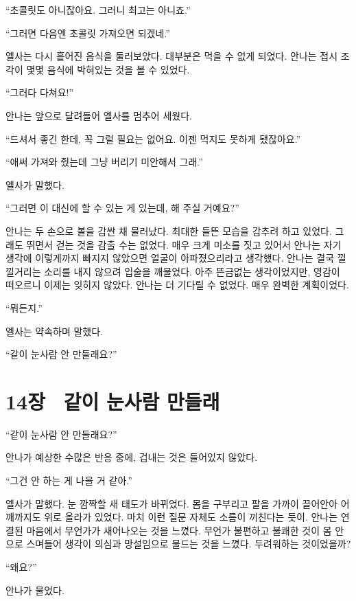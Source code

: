 ``초콜릿도 아니잖아요. 그러니 최고는 아니죠.''

``그러면 다음엔 초콜릿 가져오면 되겠네.''

엘사는 다시 흩어진 음식을 둘러보았다. 대부분은 먹을 수 없게 되었다. 안나는 접시 조각이 몇몇 음식에 박혀있는 것을 볼 수 있었다.

``그러다 다쳐요!''

안나는 앞으로 달려들어 엘사를 멈추어 세웠다.

``드셔서 좋긴 한데, 꼭 그럴 필요는 없어요. 이젠 먹지도 못하게 됐잖아요.''

``애써 가져와 줬는데 그냥 버리기 미안해서 그래.''

엘사가 말했다.

``그러면 이 대신에 할 수 있는 게 있는데, 해 주실 거예요?''

안나는 두 손으로 볼을 감싼 채 물러났다. 최대한 들뜬 모습을 감추려 하고 있었다. 그래도 뛰면서 걷는 것을 감출 수는 없었다. 매우 크게 미소를 짓고 있어서 안나는 자기 생각에 이렇게까지 빠지지 않았으면 얼굴이 아파졌으리라고 생각했다. 안나는 결국 낄낄거리는 소리를 내지 않으려 입술을 깨물었다. 아주 뜬금없는 생각이었지만, 영감이 떠오르니 이제는 잊히지 않았다. 안나는 더 기다릴 수 없었다. 매우 완벽한 계획이었다.

``뭐든지.''

엘사는 약속하며 말했다.

``같이 눈사람 안 만들래요?''



\chapter[14장  같이 눈사람 만들래][14장\hspace*{.5em}같이 눈사람 만들래]{14장 \ 같이 눈사람 만들래}



\forceindent``같이 눈사람 안 만들래요?''

안나가 예상한 수많은 반응 중에, 겁내는 것은 들어있지 않았다.

``그건 안 하는 게 나을 거 같아.''

엘사가 말했다. 눈 깜짝할 새 태도가 바뀌었다. 몸을 구부리고 팔을 가까이 끌어안아 어깨까지도 위로 올라가 있었다. 마치 이런 질문 자체도 소름이 끼친다는 듯이. 안나는 연결된 마음에서 무언가가 새어나오는 것을 느꼈다. 무언가 불편하고 불쾌한 것이 몸 안으로 스며들어 생각이 의심과 망설임으로 물드는 것을 느꼈다. 두려워하는 것이었을까?

``왜요?''

안나가 물었다.

